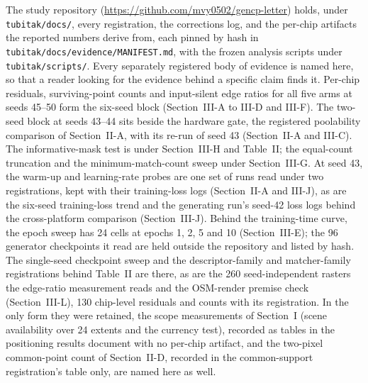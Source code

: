 
The study repository (\url{https://github.com/mvy0502/gencp-letter}) holds, under \texttt{tubitak/docs/}, every registration, the corrections log, and the
per-chip artifacts the reported numbers derive from, each pinned by hash in
\texttt{tubitak/docs/evidence/MANIFEST.md}, with the frozen analysis scripts under
\texttt{tubitak/scripts/}.
Every separately registered body of evidence is named here, so that a reader looking for
the evidence behind a specific claim finds it. Per-chip residuals, surviving-point counts and input-silent edge ratios for all five arms
at seeds 45--50 form the six-seed block (Section~III-A to III-D and III-F). The two-seed block at seeds 43--44 sits beside the
hardware gate, the registered poolability comparison of Section~II-A, with its re-run of
seed 43 (Section~II-A and III-C). The informative-mask test is under Section~III-H and
Table~II; the equal-count truncation and the minimum-match-count sweep under Section~III-G.
At seed 43, the warm-up and learning-rate probes are one set of runs read under two
registrations, kept with their training-loss logs (Section~II-A and III-J), as are the
six-seed training-loss trend and the generating run's seed-42 loss logs behind the
cross-platform comparison (Section~III-J). Behind the training-time curve, the epoch sweep has 24 cells at epochs 1, 2, 5 and 10
(Section~III-E); the 96 generator checkpoints it read
are held outside the repository and listed by hash. The single-seed checkpoint sweep and the
descriptor-family and matcher-family registrations behind Table~II are there, as are the 260
seed-independent rasters the edge-ratio measurement reads and the OSM-render premise check
(Section~III-L), 130 chip-level residuals and counts with its registration. In the only form
they were retained, the scope measurements of Section~I (scene availability over 24 extents
and the currency test), recorded as tables in the positioning results document with no
per-chip artifact, and the two-pixel common-point count of Section~II-D, recorded in the
common-support registration's table only, are named here as well.

